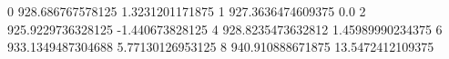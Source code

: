 0 928.686767578125 1.3231201171875
1 927.3636474609375 0.0
2 925.9229736328125 -1.440673828125
4 928.8235473632812 1.45989990234375
6 933.1349487304688 5.77130126953125
8 940.910888671875 13.5472412109375
